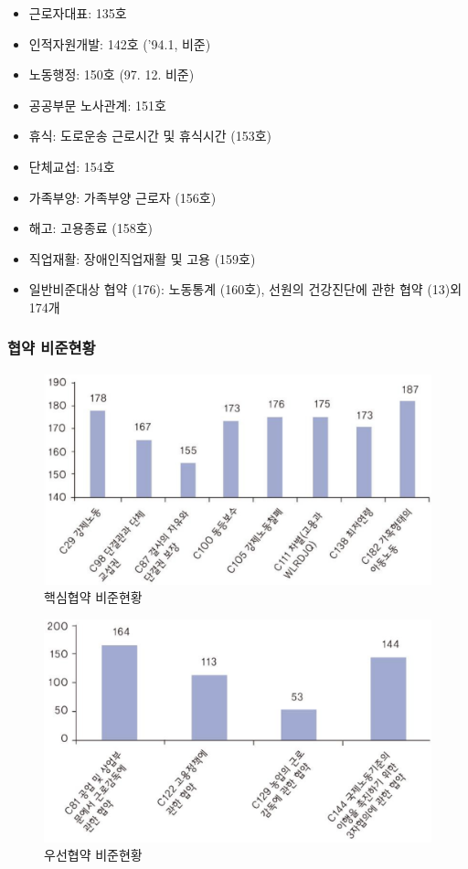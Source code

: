 \documentclass[aspectratio=169,xcolor=dvipsnames,handout]{beamer}
\begin{document}
\begin{frame}[allowframebreaks]
\begin{itemize}[<+->]
\begin{itemize}[<+->]
\begin{itemize}
                \item 근로자대표: 135호
                \item 인적자원개발: 142호 ('94.1, 비준)
                \item 노동행정: 150호 (97. 12. 비준)
                \item 공공부문 노사관계: 151호
                \item 휴식: 도로운송 근로시간 및 휴식시간 (153호)
                \item 단체교섭: 154호
                \item 가족부양: 가족부양 근로자 (156호)
                \item 해고: 고용종료 (158호)
                \item 직업재활: 장애인직업재활 및 고용 (159호)
            \end{itemize}
        \end{itemize}
        \begin{itemize}
            \item 일반비준대상 협약 (176): 노동통계 (160호), 선원의 건강진단에 관한 협약 (13)외 174개
        \end{itemize}
    \end{itemize}
\end{frame}

\begin{frame}[allowframebreaks]
    \frametitle{협약 비준현황}
    \centering
    \begin{figure}[ht]
        \includegraphics[width=.6\textwidth]{pic/ILO핵심협약}
        \caption{핵심협약 비준현황}
    \end{figure}
    \centering
    \begin{figure}[ht]
        \includegraphics[width=.6\textwidth]{pic/ILO우선협약}
        \caption{우선협약 비준현황}
    \end{figure}
\end{frame}
\end{document}
